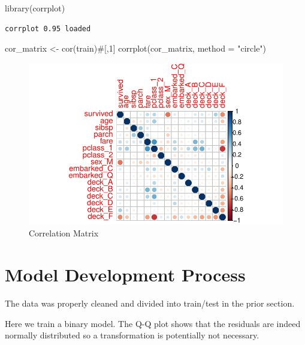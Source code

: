 \documentclass[
  letterpaper,
  DIV=11,
  numbers=noendperiod]{scrartcl}
\newenvironment{Shaded}{\begin{snugshade}}{\end{snugshade}}
\newcommand{\AttributeTok}[1]{\textcolor[rgb]{0.40,0.45,0.13}{#1}}
\newcommand{\CommentTok}[1]{\textcolor[rgb]{0.37,0.37,0.37}{#1}}
\newcommand{\FunctionTok}[1]{\textcolor[rgb]{0.28,0.35,0.67}{#1}}
\newcommand{\NormalTok}[1]{\textcolor[rgb]{0.00,0.23,0.31}{#1}}
\newcommand{\OtherTok}[1]{\textcolor[rgb]{0.00,0.23,0.31}{#1}}
\newcommand{\StringTok}[1]{\textcolor[rgb]{0.13,0.47,0.30}{#1}}
\begin{document}
\begin{Shaded}
\begin{Highlighting}[]
\FunctionTok{library}\NormalTok{(corrplot)}
\end{Highlighting}
\end{Shaded}

\begin{verbatim}
corrplot 0.95 loaded
\end{verbatim}

\begin{Shaded}
\begin{Highlighting}[]
\NormalTok{cor\_matrix }\OtherTok{\textless{}{-}} \FunctionTok{cor}\NormalTok{(train)}\CommentTok{\#[,1]}
\FunctionTok{corrplot}\NormalTok{(cor\_matrix, }\AttributeTok{method =} \StringTok{"circle"}\NormalTok{)}
\end{Highlighting}
\end{Shaded}

\begin{figure}[H]

{\centering \includegraphics{FinalProject_files/figure-pdf/unnamed-chunk-16-1.pdf}

}

\caption{Correlation Matrix}

\end{figure}%

\section{Model Development Process}\label{model-development-process}

The data was properly cleaned and divided into train/test in the prior
section.

Here we train a binary model. The Q-Q plot shows that the residuals are
indeed normally distributed so a transformation is potentially not
necessary.
\end{document}

